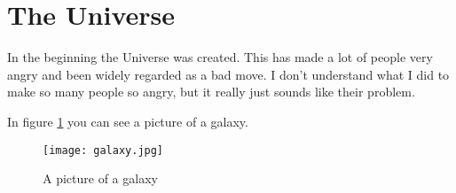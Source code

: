 \maketitle
\section*{The Universe}
In the beginning the Universe was created. This has made a lot of people very angry and been widely regarded as a bad move.
I don't understand what I did to make so many people so angry, but it really just sounds like their problem.

In figure \ref{fig:universe} you can see a picture of a galaxy.

\begin{figure}
  \center
  \texttt{[image: galaxy.jpg]}
  \caption{A picture of a galaxy}
  \label{fig:universe}
\end{figure}